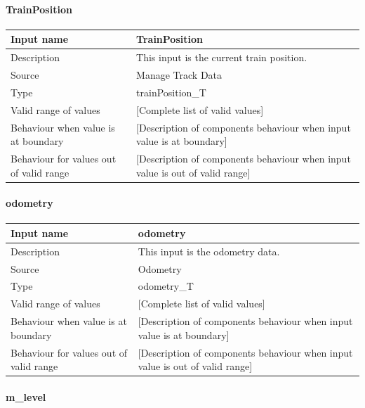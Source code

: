 \paragraph{TrainPosition}

\begin{longtable}{p{}p{}}
\toprule
Input name				& TrainPosition \\
\midrule
Description				& This input is the current train position. \\
\midrule
Source					& Manage Track Data \\ 
\midrule
Type					& trainPosition\_T \\
\midrule
Valid range of values	& [Complete list of valid values] \\
\midrule
Behaviour when value is at boundary	& [Description of components behaviour when input value is at boundary] \\
\midrule
Behaviour for values out of valid range	& [Description of components behaviour when input value is out of valid range] \\
\bottomrule
\end{longtable}


\paragraph{odometry}

\begin{longtable}{p{}p{}}
\toprule
Input name				& odometry \\
\midrule
Description				& This input is the odometry data. \\
\midrule
Source					& Odometry \\ 
\midrule
Type					& odometry\_T \\
\midrule
Valid range of values	& [Complete list of valid values] \\
\midrule
Behaviour when value is at boundary	& [Description of components behaviour when input value is at boundary] \\
\midrule
Behaviour for values out of valid range	& [Description of components behaviour when input value is out of valid range] \\
\bottomrule
\end{longtable}


\paragraph{m\_level}

